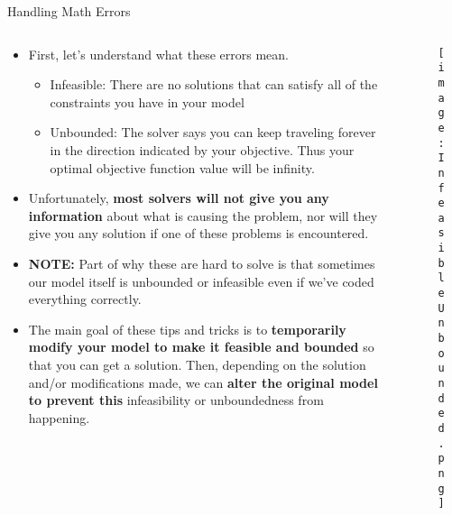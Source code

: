 \documentclass[10pt, aspectratio=169]{beamer}
\begin{document}
\begin{frame}{Handling Math Errors}
    \begin{columns}
        \begin{column}{0.8\textwidth}
            \begin{itemize}
                \item First, let's understand what these errors mean.
                \begin{itemize}
                    \item Infeasible: There are no solutions that can satisfy all of the constraints you have in your model
                    \item Unbounded: The solver says you can keep traveling forever in the direction indicated by your objective. Thus your optimal objective function value will be infinity.
                \end{itemize}
                \item Unfortunately, \textbf{most solvers will not give you any information} about what is causing the problem, nor will they give you any solution if one of these problems is encountered.
                \item \textbf{NOTE:} Part of why these are hard to solve is that sometimes our model itself is unbounded or infeasible even if we've coded everything correctly.
                \item The main goal of these tips and tricks is to \textbf{temporarily modify your model to make it feasible and bounded} so that you can get a solution. Then, depending on the solution and/or modifications made, we can \textbf{alter the original model to prevent this} infeasibility or unboundedness from happening.
            \end{itemize}
        \end{column}
        \begin{column}{0.2 \textwidth}
            \begin{figure}
                \texttt{[image: InfeasibleUnbounded.png]}
            \end{figure}
        \end{column}
    \end{columns}
\end{frame}
\end{document}
